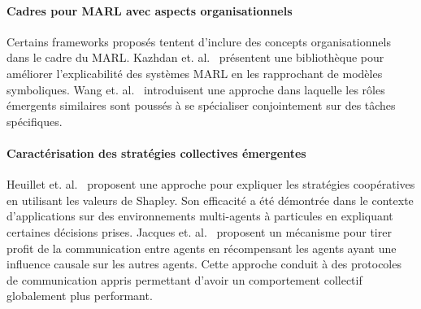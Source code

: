 \documentclass[demonstration]{jfsma}
\newcommand{\jp}[1]{\textbf{\color{red} JPJ: #1}}
\begin{document}
\paragraph{\textbf{Cadres pour MARL avec aspects organisationnels}}
%
Certains frameworks proposés tentent d'inclure des concepts organisationnels dans le cadre du MARL.
Kazhdan et. al.~\cite{Kazhdan2020} présentent une bibliothèque pour améliorer l'explicabilité des systèmes MARL en les rapprochant de modèles symboliques.
%
Wang et. al.~\cite{Wang2020} introduisent une approche dans laquelle les rôles émergents similaires sont poussés à se spécialiser conjointement sur des tâches spécifiques.
%
%

\paragraph{\textbf{Caractérisation des stratégies collectives émergentes}}
%
Heuillet et. al.~\cite{Heuillet2022} proposent une approche pour expliquer les stratégies coopératives en utilisant les valeurs de Shapley. Son efficacité a été démontrée dans le contexte d'applications sur des environnements multi-agents à particules en  expliquant certaines décisions prises. 
%
Jacques et. al.~\cite{Jaques2019} proposent un mécanisme pour tirer profit de la communication entre agents en récompensant les agents ayant une influence causale sur les autres agents. Cette approche conduit à des protocoles de communication appris permettant d'avoir un comportement collectif globalement plus performant.
\end{document}
